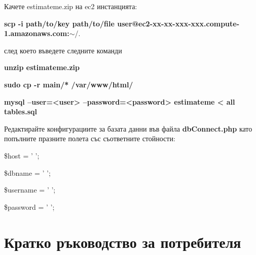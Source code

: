 \documentclass[12pt]{article}
\begin{document}
\medskip
\noindent Качете estimateme.zip на ec2 инстанцията:

\medskip
\textbf{scp -i path/to/key path/to/file user@ec2-xx-xx-xxx-xxx.compute-1.amazonaws.com:}$\sim$/. 

 \noindent след което въведете следните команди
 
 \medskip
\textbf{unzip estimateme.zip}

\medskip
\textbf{sudo cp -r main/* /var/www/html/}

\medskip
\textbf{mysql --user=<user> --password=<password> estimateme < all{\textunderscore} tables.sql}

Редактирайте конфигурациите за базата данни във файла \textbf{dbConnect.php} като попълните празните полета със съответните стойности:

\medskip
\$host = ' '; 

\medskip
\$dbname = ' '; 

\medskip
\$username = ' ';

\medskip
\$password = ' '; 

\section{Кратко ръководство за потребителя}
\end{document}

